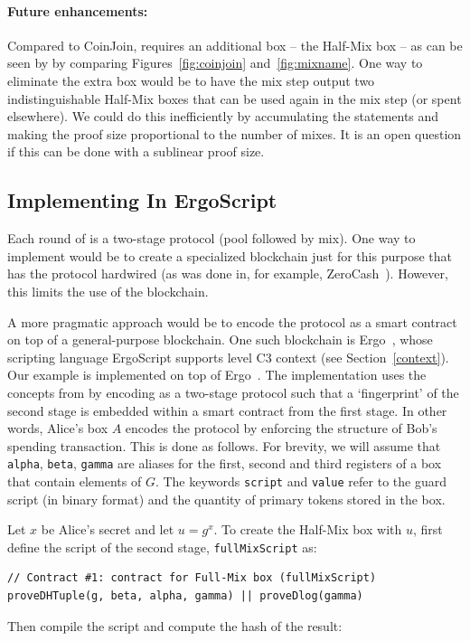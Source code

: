 \documentclass[runningheads]{llncs}
\newcommand{\langname}{ErgoScript\xspace}
\begin{document}
\paragraph{Future enhancements:} Compared to CoinJoin, \algname requires an additional box -- the Half-Mix box -- as can be seen by by comparing Figures~\ref{fig:coinjoin} and~\ref{fig:mixname}. One way to eliminate the extra box would be to have the mix step output two indistinguishable Half-Mix boxes that can be used again in the mix step (or spent elsewhere). We could do this inefficiently by accumulating the statements and making the proof size proportional to the number of mixes. It is an open question if this can be done with a sublinear proof size.

\subsection{Implementing \algname In \langname}
\label{impl}
Each round of \algname is a two-stage protocol (pool followed by mix). One way to implement \algname would be to create a specialized blockchain just for this purpose that has the protocol hardwired (as was done in, for example, ZeroCash~\cite{zcash}). However, this limits the use of the blockchain. 

A more pragmatic approach would be to encode the protocol as a smart contract on top of a general-purpose blockchain. 
One such blockchain is Ergo~\cite{ergo}, whose scripting language \langname supports level C3 context (see Section~\ref{context}). Our example is implemented on top of Ergo~\cite{ergomix-impl}. 
The implementation uses the concepts from \cite{multistage} by encoding \algname as a two-stage protocol such that a `fingerprint' of the second stage is embedded within a smart contract from the first stage. 
In other words, Alice's box $A$ encodes the protocol by enforcing the structure of Bob's spending transaction. 
This is done as follows. For brevity, we will assume that \texttt{alpha}, \texttt{beta}, \texttt{gamma} are aliases for the first, second and third registers of a box that contain elements of $G$. The keywords \texttt{script} and \texttt{value} refer to the guard script (in binary format) and the quantity of primary tokens stored in the box. 

Let $x$ be Alice's secret and let $u = g^x$. To create the Half-Mix box with $u$, first define the script of the second stage, \texttt{fullMixScript} as:
{\small
\begin{Verbatim}[frame=single]
// Contract #1: contract for Full-Mix box (fullMixScript)
proveDHTuple(g, beta, alpha, gamma) || proveDlog(gamma)
\end{Verbatim}
}
Then compile the script and compute the hash of the result:
\end{document}

